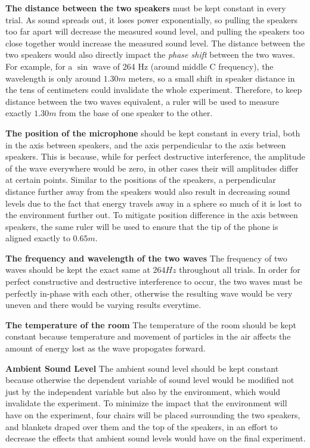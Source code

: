\documentclass[index]{subfiles}
\begin{document}
\textbf{The distance between the two speakers} must be kept constant in every trial. As sound spreads out, it loses power exponentially, so pulling the speakers too far apart will decrease the measured sound level, and pulling the speakers too close together would increase the measured sound level. The distance between the two speakers would also directly impact the \textit{phase shift} between the two waves. For example, for a \(\sin\) wave of 264 Hz (around middle C frequency), the wavelength is only around \(1.30m\) meters, so a small shift in speaker distance in the tens of centimeters could invalidate the whole experiment. Therefore, to keep distance between the two waves equivalent, a ruler will be used to measure exactly \(1.30m\) from the base of one speaker to the other.

\textbf{The position of the microphone} should be kept constant in every trial, both in the axis between speakers, and the axis perpendicular to the axis between speakers. This is because, while for perfect destructive interference, the amplitude of the wave everywhere would be zero, in other cases their will amplitudes differ at certain points. Similar to the positions of the speakers, a perpendicular distance further away from the speakers would also result in decreasing sound levels due to the fact that energy travels away in a sphere so much of it is lost to the environment further out. To mitigate position difference in the axis between speakers, the same ruler will be used to ensure that the tip of the phone is aligned exactly to \(0.65m\).

\textbf{The frequency and wavelength of the two waves} The frequency of two waves should be kept the exact same at \(264Hz\) throughout all trials. In order for perfect constructive and destructive interference to occur, the two waves must be perfectly in-phase with each other, otherwise the resulting wave would be very uneven and there would be varying results everytime.

\textbf{The temperature of the room} The temperature of the room should be kept constant because temperature and movement of particles in the air affects the amount of energy lost as the wave propogates forward.

\textbf{Ambient Sound Level} The ambient sound level should be kept constant because otherwise the dependent variable of sound level would be modified not just by the independent variable but also by the environment, which would invalidate the experiment. To minimize the impact that the environment will have on the experiment, four chairs will be placed surrounding the two speakers, and blankets draped over them and the top of the speakers, in an effort to decrease the effects that ambient sound levels would have on the final experiment.
\end{document}
